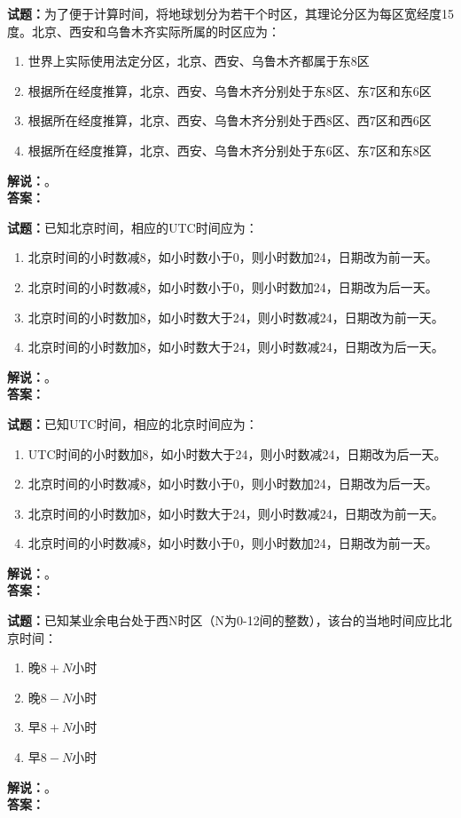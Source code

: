 \documentclass{ctexbook}
\begin{document}
\noindent\textbf{试题：}为了便于计算时间，将地球划分为若干个时区，其理论分区为每区宽经度15度。北京、西安和乌鲁木齐实际所属的时区应为：
\begin{enumerate}[leftmargin=3em]
  \item 世界上实际使用法定分区，北京、西安、乌鲁木齐都属于东8区
  \item 根据所在经度推算，北京、西安、乌鲁木齐分别处于东8区、东7区和东6区
  \item 根据所在经度推算，北京、西安、乌鲁木齐分别处于西8区、西7区和西6区
  \item 根据所在经度推算，北京、西安、乌鲁木齐分别处于东6区、东7区和东8区
\end{enumerate}
\noindent\textbf{解说：}\textbf{}。\\\noindent\textbf{答案：}

\bigskip

\noindent\textbf{试题：}已知北京时间，相应的UTC时间应为：
\begin{enumerate}[leftmargin=3em]
  \item 北京时间的小时数减8，如小时数小于0，则小时数加24，日期改为前一天。
  \item 北京时间的小时数减8，如小时数小于0，则小时数加24，日期改为后一天。
  \item 北京时间的小时数加8，如小时数大于24，则小时数减24，日期改为前一天。
  \item 北京时间的小时数加8，如小时数大于24，则小时数减24，日期改为后一天。
\end{enumerate}
\noindent\textbf{解说：}\textbf{}。\\\noindent\textbf{答案：}

\bigskip

\noindent\textbf{试题：}已知UTC时间，相应的北京时间应为：
\begin{enumerate}[leftmargin=3em]
  \item UTC时间的小时数加8，如小时数大于24，则小时数减24，日期改为后一天。
  \item 北京时间的小时数减8，如小时数小于0，则小时数加24，日期改为后一天。
  \item 北京时间的小时数加8，如小时数大于24，则小时数减24，日期改为前一天。
  \item 北京时间的小时数减8，如小时数小于0，则小时数加24，日期改为前一天。
\end{enumerate}
\noindent\textbf{解说：}\textbf{}。\\\noindent\textbf{答案：}

\bigskip

\noindent\textbf{试题：}已知某业余电台处于西N时区（N为0-12间的整数），该台的当地时间应比北京时间：
\begin{enumerate}[leftmargin=3em]
  \item 晚\(8+N\)小时
  \item 晚\(8-N\)小时
  \item 早\(8+N\)小时
  \item 早\(8-N\)小时
\end{enumerate}
\noindent\textbf{解说：}\textbf{}。\\\noindent\textbf{答案：}
\end{document}
